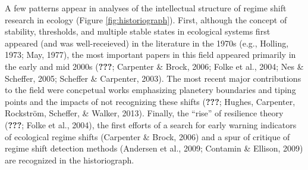 \documentclass[12pt,twoside,openany]{reedthesis}
\begin{document}
A few patterns appear in analyses of the intellectual structure of regime shift research in ecology (Figure \ref{fig:historiograph}). First, although the concept of stability, thresholds, and multiple stable states in ecological systems first appeared (and was well-receieved) in the literature in the 1970s (e.g., Holling, 1973; May, 1977), the most important papers in this field appeared primarily in the early and mid 2000s ({\textbf{???}}; Carpenter \& Brock, 2006; Folke et al., 2004; Nes \& Scheffer, 2005; Scheffer \& Carpenter, 2003). The most recent major contributions to the field were concpetual works emphasizing planetery boundaries and tiping points and the impacts of not recognizing these shifts ({\textbf{???}}; Hughes, Carpenter, Rockström, Scheffer, \& Walker, 2013). Finally, the ``rise'' of resilience theory ({\textbf{???}}; Folke et al., 2004), the first efforts of a search for early warning indicators of ecological regime shifts (Carpenter \& Brock, 2006) and a spur of critique of regime shift detection methods (Andersen et al., 2009; Contamin \& Ellison, 2009) are recognized in the historiograph.
\end{document}
